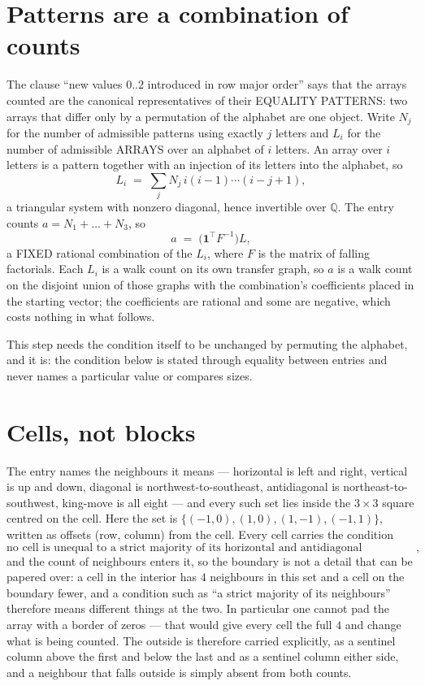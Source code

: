 \documentclass[11pt,a4paper]{article}
\theoremstyle{plain}
\theoremstyle{definition}
\begin{document}
\section{Patterns are a combination of counts}

The clause ``new values $0..2$ introduced in row major order'' says that the arrays
counted are the canonical representatives of their EQUALITY PATTERNS: two arrays that differ
only by a permutation of the alphabet are one object. Write $N_j$ for the number of admissible
patterns using exactly $j$ letters and $L_i$ for the number of admissible ARRAYS over an
alphabet of $i$ letters. An array over $i$ letters is a pattern together with an injection of
its letters into the alphabet, so
\[
L_i\;=\;\sum_{j}N_j\,i(i-1)\cdots(i-j+1),
\]
a triangular system with nonzero diagonal, hence invertible over $\mathbb{Q}$. The entry
counts $a=N_1+\dots+N_{3}$, so
\[
a\;=\;\bigl(\mathbf{1}^{\!\top}F^{-1}\bigr)L ,
\]
a FIXED rational combination of the $L_i$, where $F$ is the matrix of falling factorials.
Each $L_i$ is a walk count on its own transfer graph, so $a$ is a walk count on the disjoint
union of those graphs with the combination's coefficients placed in the starting vector; the
coefficients are rational and some are negative, which costs nothing in what follows.

This step needs the condition itself to be unchanged by permuting the alphabet, and it is:
the condition below is stated through equality between entries and never names a particular
value or compares sizes.

\section{Cells, not blocks}

The entry names the neighbours it means --- horizontal is left and right, vertical is up and
down, diagonal is northwest-to-southeast, antidiagonal is northeast-to-southwest, king-move is
all eight --- and every such set lies inside the $3\times3$ square centred on the cell. Here
the set is $\{(-1,0), (1,0), (1,-1), (-1,1)\}$, written as offsets (row, column) from the cell. Every cell carries
the condition
\[
\text{no cell is unequal to a strict majority of its horizontal and antidiagonal neighbours},
\]
and the count of neighbours enters it, so the boundary is not a detail that can be papered
over: a cell in the interior has $4$ neighbours in this set and a cell on the boundary
fewer, and a condition such as ``a strict majority of its neighbours'' therefore means
different things at the two. In particular one cannot pad the array with a border of zeros ---
that would give every cell the full $4$ and change what is being counted. The outside is
therefore carried
explicitly, as a sentinel column above the first and below the last and as a sentinel column
either side, and a neighbour that falls outside is simply absent from both counts.
\end{document}
